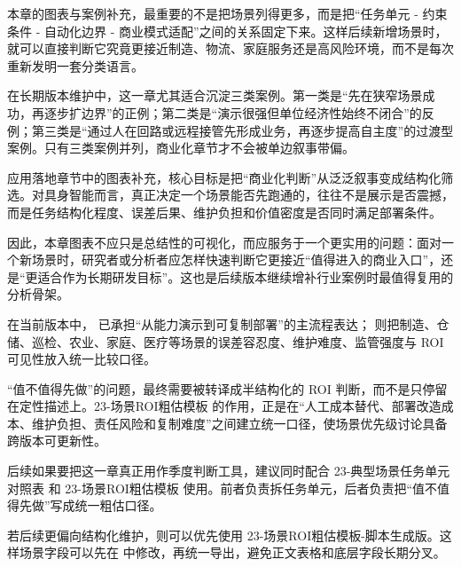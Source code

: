 本章的图表与案例补充，最重要的不是把场景列得更多，而是把“任务单元 - 约束条件 - 自动化边界 - 商业模式适配”之间的关系固定下来。这样后续新增场景时，就可以直接判断它究竟更接近制造、物流、家庭服务还是高风险环境，而不是每次重新发明一套分类语言。

在长期版本维护中，这一章尤其适合沉淀三类案例。第一类是“先在狭窄场景成功，再逐步扩边界”的正例；第二类是“演示很强但单位经济性始终不闭合”的反例；第三类是“通过人在回路或远程接管先形成业务，再逐步提高自主度”的过渡型案例。只有三类案例并列，商业化章节才不会被单边叙事带偏。

应用落地章节中的图表补充，核心目标是把“商业化判断”从泛泛叙事变成结构化筛选。对具身智能而言，真正决定一个场景能否先跑通的，往往不是展示是否震撼，而是任务结构化程度、误差后果、维护负担和价值密度是否同时满足部署条件。

因此，本章图表不应只是总结性的可视化，而应服务于一个更实用的问题：面对一个新场景时，研究者或分析者应怎样快速判断它更接近“值得进入的商业入口”，还是“更适合作为长期研发目标”。这也是后续版本继续增补行业案例时最值得复用的分析骨架。

在当前版本中，\texttt{} 已承担“从能力演示到可复制部署”的主流程表达；\texttt{} 则把制造、仓储、巡检、农业、家庭、医疗等场景的误差容忍度、维护难度、监管强度与 ROI 可见性放入统一比较口径。

“值不值得先做”的问题，最终需要被转译成半结构化的 ROI 判断，而不是只停留在定性描述上。23-场景ROI粗估模板 的作用，正是在“人工成本替代、部署改造成本、维护负担、责任风险和复制难度”之间建立统一口径，使场景优先级讨论具备跨版本可更新性。

后续如果要把这一章真正用作季度判断工具，建议同时配合 23-典型场景任务单元对照表 和 23-场景ROI粗估模板 使用。前者负责拆任务单元，后者负责把“值不值得先做”写成统一粗估口径。

若后续更偏向结构化维护，则可以优先使用 23-场景ROI粗估模板-脚本生成版。这样场景字段可以先在  中修改，再统一导出，避免正文表格和底层字段长期分叉。
